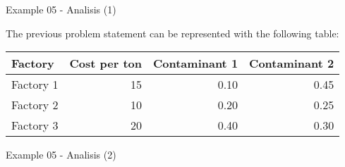 \begin{frame}{Example 05 - Analisis (1)}

The previous problem statement can be represented with the following table:

\begin{center}
\begin{tabular}{lrrr}
\hline
  \cellcolor{gray90}\textbf{Factory}
& \cellcolor{gray90}\textbf{Cost per ton}
& \cellcolor{gray90}\textbf{Contaminant 1}
& \cellcolor{gray90}\textbf{Contaminant 2} \\
\hline
Factory 1 & 15 & 0.10 & 0.45 \\
Factory 2 & 10 & 0.20 & 0.25 \\
Factory 3 & 20 & 0.40 & 0.30 \\
\hline
\end{tabular}
\end{center}

\end{frame}

\begin{frame}{Example 05 - Analisis (2)}
\end{frame}

